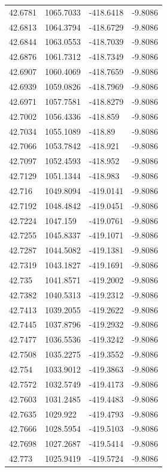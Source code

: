 \begin{table}[H]
\begin{tabular}{llll}
42.6781 & 1065.7033 & -418.6418 & -9.8086 \\
42.6813 & 1064.3794 & -418.6729 & -9.8086 \\
42.6844 & 1063.0553 & -418.7039 & -9.8086 \\
42.6876 & 1061.7312 & -418.7349 & -9.8086 \\
42.6907 & 1060.4069 & -418.7659 & -9.8086 \\
42.6939 & 1059.0826 & -418.7969 & -9.8086 \\
42.6971 & 1057.7581 & -418.8279 & -9.8086 \\
42.7002 & 1056.4336 & -418.859 & -9.8086 \\
42.7034 & 1055.1089 & -418.89 & -9.8086 \\
42.7066 & 1053.7842 & -418.921 & -9.8086 \\
42.7097 & 1052.4593 & -418.952 & -9.8086 \\
42.7129 & 1051.1344 & -418.983 & -9.8086 \\
42.716 & 1049.8094 & -419.0141 & -9.8086 \\
42.7192 & 1048.4842 & -419.0451 & -9.8086 \\
42.7224 & 1047.159 & -419.0761 & -9.8086 \\
42.7255 & 1045.8337 & -419.1071 & -9.8086 \\
42.7287 & 1044.5082 & -419.1381 & -9.8086 \\
42.7319 & 1043.1827 & -419.1691 & -9.8086 \\
42.735 & 1041.8571 & -419.2002 & -9.8086 \\
42.7382 & 1040.5313 & -419.2312 & -9.8086 \\
42.7413 & 1039.2055 & -419.2622 & -9.8086 \\
42.7445 & 1037.8796 & -419.2932 & -9.8086 \\
42.7477 & 1036.5536 & -419.3242 & -9.8086 \\
42.7508 & 1035.2275 & -419.3552 & -9.8086 \\
42.754 & 1033.9012 & -419.3863 & -9.8086 \\
42.7572 & 1032.5749 & -419.4173 & -9.8086 \\
42.7603 & 1031.2485 & -419.4483 & -9.8086 \\
42.7635 & 1029.922 & -419.4793 & -9.8086 \\
42.7666 & 1028.5954 & -419.5103 & -9.8086 \\
42.7698 & 1027.2687 & -419.5414 & -9.8086 \\
42.773 & 1025.9419 & -419.5724 & -9.8086 \\

\end{tabular}
\end{table}

